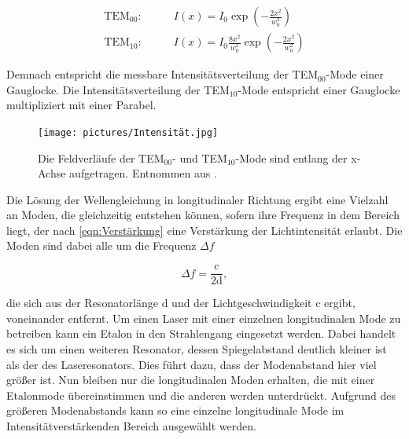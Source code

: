             \begin{align}
                \text{TEM}_{00}:& \qquad I(x) = I_0 \exp \left(-\frac{2x^2}{w_0^2}\right) \\
                \text{TEM}_{10}:& \qquad I(x) = I_0 \frac{8x^2}{w_0^2} \exp \left(-\frac{2x^2}{w_0^2}\right)
            \end{align}
                
            Demnach entspricht die messbare Intensitätsverteilung der TEM$_{00}$-Mode einer Gauglocke. Die Intensitätsverteilung der TEM$_{10}$-Mode entspricht einer Gauglocke multipliziert mit einer 
            Parabel.\newline

            \begin{figure}[h]
                \centering
                \texttt{[image: pictures/Intensität.jpg]}
                \caption{Die Feldverläufe der TEM$_{00}$- und TEM$_{10}$-Mode sind entlang der x-Achse aufgetragen. Entnommen aus \cite{demtroder_laserspektroskopie_2011}.}
                \label{fig:Intensität}
            \end{figure}

         

            Die Lösung der Wellengleichung in longitudinaler Richtung ergibt eine Vielzahl an Moden, die gleichzeitig entstehen können, sofern ihre Frequenz in dem Bereich liegt, der nach \ref{eqn:Verstärkung}
            eine Verstärkung der Lichtintensität erlaubt. Die Moden sind dabei alle um die Frequenz $\Delta f$ 

            \begin{equation*}
                \Delta f = \frac{\text{c}}{2\text{d}},
            \end{equation*}

            die sich aus der Resonatorlänge d und der Lichtgeschwindigkeit c ergibt, voneinander entfernt. Um einen Laser mit einer einzelnen longitudinalen Mode zu betreiben kann ein Etalon in den 
            Strahlengang eingesetzt werden. Dabei handelt es sich um einen weiteren Resonator, dessen Spiegelabstand deutlich kleiner ist als der des Laseresonators. Dies führt dazu, dass der Modenabstand 
            hier viel größer ist. Nun bleiben nur die longitudinalen Moden erhalten, die mit einer Etalonmode übereinstimmen und die anderen werden unterdrückt. Aufgrund des größeren Modenabstands kann so eine
            einzelne longitudinale Mode im Intensitätverstärkenden Bereich ausgewählt werden. 


